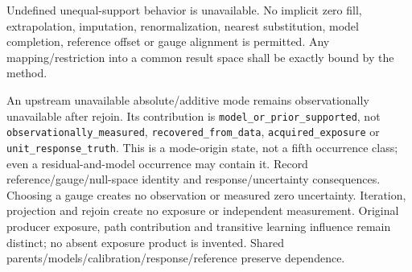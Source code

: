 {{Undefined unequal-support behavior is unavailable. No implicit zero fill,
extrapolation, imputation, renormalization, nearest substitution, model completion,
reference offset or gauge alignment is permitted. Any mapping/restriction into
a common result space shall be exactly bound by the method.

An upstream unavailable absolute/additive mode remains observationally
unavailable after rejoin. Its contribution is \texttt{model\_or\_prior\_supported},
not \texttt{observationally\_measured}, \texttt{recovered\_from\_data},
\texttt{acquired\_exposure} or \texttt{unit\_response\_truth}. This is a
mode-origin state, not a fifth occurrence class; even a residual-and-model
occurrence may contain it. Record reference/gauge/null-space identity and
response/uncertainty consequences. Choosing a gauge creates no observation or
measured zero uncertainty. Iteration, projection and rejoin create no exposure
or independent measurement. Original producer exposure, path contribution and
transitive learning influence remain distinct; no absent exposure product is
invented. Shared parents/models/calibration/response/reference preserve dependence.
}}
